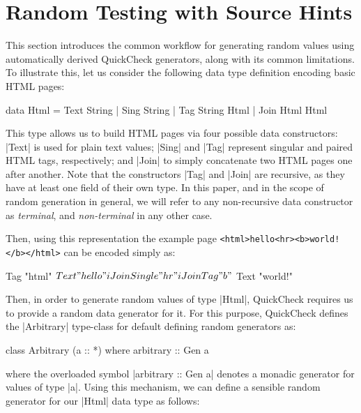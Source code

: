 \section{Random Testing with Source Hints}
\label{sec:sources}

%
This section introduces the common workflow for generating random values using
automatically derived QuickCheck generators, along with its common limitations.
%
To illustrate this, let us consider the following data type definition encoding
basic HTML pages:

\begin{code}
data Html
  =  Text  String
  |  Sing  String
  |  Tag   String Html
  |  Join  Html Html
\end{code}

This type allows us to build HTML pages via four possible data constructors:
|Text| is used for plain text values; |Sing| and |Tag| represent singular and
paired HTML tags, respectively; and |Join| to simply concatenate two HTML pages
one after another.
%
Note that the constructors |Tag| and |Join| are recursive, as they have at least
one field of their own type.
%
In this paper, and in the scope of random generation in general, we will refer
to any non-recursive data constructor as \emph{terminal}, and
\emph{non-terminal} in any other case.


Then, using this representation the example page\linebreak
%
\texttt{<html>hello<hr><b>world!</b></html>}
%
can be encoded simply as:
%
\begin{code}
Tag "html" $  Text "hello"
              iJoin Single "hr"
              iJoin Tag "b" $ Text "world!"
\end{code} %

%
Then, in order to generate random values of type |Html|, QuickCheck requires us
to provide a random data generator for it.
%
For this purpose, QuickCheck defines the |Arbitrary| type-class for default
defining random generators as:

\begin{code}
class Arbitrary (a :: *) where
  arbitrary :: Gen a
\end{code}
%
where the overloaded symbol |arbitrary :: Gen a| denotes a monadic generator for
values of type |a|.
%
Using this mechanism, we can define a sensible random generator for our |Html|
data type as follows:

